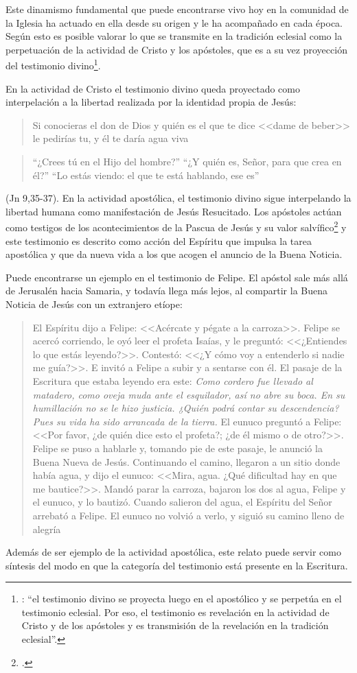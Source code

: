 Este dinamismo fundamental que puede encontrarse vivo hoy en la comunidad de la Iglesia ha actuado en ella desde su origen y le ha acompañado en cada época. Según esto es posible valorar lo que se transmite en la tradición eclesial como la perpetuación de la actividad de Cristo y los apóstoles, que es a su vez proyección del testimonio divino\footnote{\Cite[Cf.][573]{ninot2009tf}: \enquote{el testimonio divino se proyecta luego en el apostólico y se perpetúa en el testimonio eclesial. Por eso, el testimonio es revelación en la actividad de Cristo y de los apóstoles y es transmisión de la revelación en la tradición eclesial}.}.

En la actividad de Cristo el testimonio divino queda proyectado como interpelación a la libertad realizada por la identidad propia de Jesús: \blockquote[][\,(Jn 4,10)]{Si conocieras el don de Dios y quién es el que te dice <<dame de beber>> le pedirías tu, y él te daría agua viva}; \blockquote{``¿Crees tú en el Hijo del hombre?''\textelp{} ``¿Y quién es, Señor, para que crea en él?''\textelp{} ``Lo estás viendo: el que te está hablando, ese es''} (Jn 9,35-37). En la actividad apostólica, el testimonio divino sigue interpelando la libertad humana como manifestación de Jesús Resucitado. Los apóstoles actúan como testigos de los acontecimientos de la Pascua de Jesús y su valor salvífico\footcite[Cf.][576]{ninot2009tf} y este testimonio es descrito como acción del Espíritu que impulsa la tarea apostólica y que da nueva vida a los que acogen el anuncio de la Buena Noticia.

Puede encontrarse un ejemplo en el testimonio de Felipe. El apóstol sale más allá de Jerusalén hacia Samaria, y todavía llega más lejos, al compartir la Buena Noticia de Jesús con un extranjero etíope: \blockquote[][\,(Hch 8, 29-39)]{El Espíritu dijo a Felipe: <<Acércate y pégate a la carroza>>. Felipe se acercó corriendo, le oyó leer el profeta Isaías, y le preguntó: <<¿Entiendes lo que estás leyendo?>>. Contestó: <<¿Y cómo voy a entenderlo si nadie me guía?>>. E invitó a Felipe a subir y a sentarse con él. El pasaje de la Escritura que estaba leyendo era este: \emph{Como cordero fue llevado al matadero, como oveja muda ante el esquilador, así no abre su boca. En su humillación no se le hizo justicia. ¿Quién podrá contar su descendencia? Pues su vida ha sido arrancada de la tierra.} El eunuco preguntó a Felipe: <<Por favor, ¿de quién dice esto el profeta?; ¿de él mismo o de otro?>>. Felipe se puso a hablarle y, tomando pie de este pasaje, le anunció la Buena Nueva de Jesús. Continuando el camino, llegaron a un sitio donde había agua, y dijo el eunuco: <<Mira, agua. ¿Qué dificultad hay en que me bautice?>>. Mandó parar la carroza, bajaron los dos al agua, Felipe y el eunuco, y lo bautizó. Cuando salieron del agua, el Espíritu del Señor arrebató a Felipe. El eunuco no volvió a verlo, y siguió su camino lleno de alegría}. Además de ser ejemplo de la actividad apostólica, este relato puede servir como síntesis del modo en que la categoría del testimonio está presente en la Escritura.

